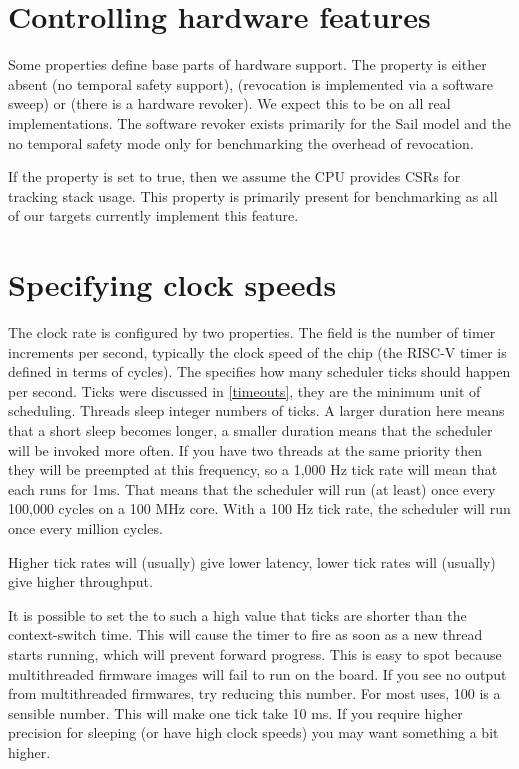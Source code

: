 \section{Controlling hardware features}

Some properties define base parts of hardware support.
The  property is either absent (no temporal safety support),  (revocation is implemented via a software sweep) or  (there is a hardware revoker).
We expect this to be  on all real implementations. 
The software revoker exists primarily for the Sail model and the no temporal safety mode only for benchmarking the overhead of revocation.

If the  property is set to true, then we assume the CPU provides CSRs for tracking stack usage.
This property is primarily present for benchmarking as all of our targets currently implement this feature.

\section{Specifying clock speeds}

The clock rate is configured by two properties.
The  field is the number of timer increments per second, typically the clock speed of the chip (the RISC-V timer is defined in terms of cycles).
The  specifies how many scheduler ticks should happen per second.
Ticks were discussed in \ref{timeouts}, they are the minimum unit of scheduling.
Threads sleep integer numbers of ticks.
A larger duration here means that a short sleep becomes longer, a smaller duration means that the scheduler will be invoked more often.
If you have two threads at the same priority then they will be preempted at this frequency, so a 1,000 Hz tick rate will mean that each runs for 1ms.
That means that the scheduler will run (at least) once every 100,000 cycles on a 100 MHz core.
With a 100 Hz tick rate, the scheduler will run once every million cycles.

Higher tick rates will (usually) give lower latency, lower tick rates will (usually) give higher throughput.

\begin{warning}
	It is possible to set the  to such a high value that ticks are shorter than the context-switch time.
	This will cause the timer to fire as soon as a new thread starts running, which will prevent forward progress.
	This is easy to spot because multithreaded firmware images will fail to run on the board.
	If you see no output from multithreaded firmwares, try reducing this number.
	For most uses, 100 is a sensible number.
	This will make one tick take 10 ms.
	If you require higher precision for sleeping (or have high clock speeds) you may want something a bit higher.
\end{warning}

